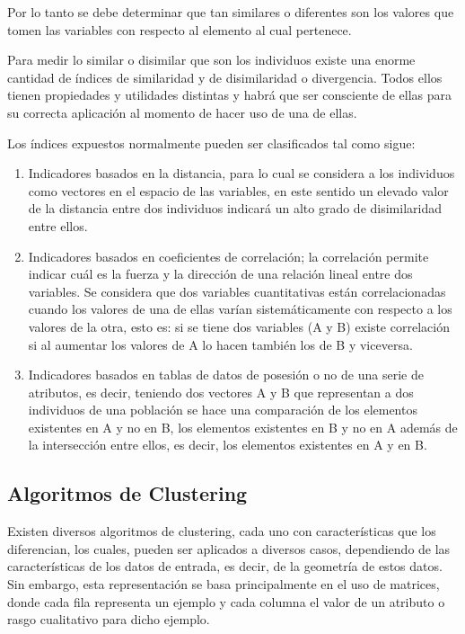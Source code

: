 Por lo tanto se debe determinar que tan similares o diferentes son los valores que tomen las variables con respecto al elemento al cual pertenece.

Para medir lo similar o disimilar que son los individuos existe una enorme cantidad de índices de similaridad y de disimilaridad o divergencia. Todos ellos tienen propiedades y utilidades distintas y habrá que ser consciente de ellas para su correcta aplicación al momento de hacer uso de una de ellas.

Los índices expuestos normalmente pueden ser clasificados tal como sigue:

\begin{enumerate}
	
	\item  Indicadores basados en la distancia, para lo cual se considera a los individuos como vectores en el espacio de las variables, en este sentido un elevado valor de la distancia entre dos individuos indicará un alto grado de disimilaridad entre ellos.
	
	\item Indicadores basados en coeficientes de correlación; la correlación permite indicar cuál es la fuerza y la dirección de una relación lineal entre dos variables. Se considera que dos variables cuantitativas están correlacionadas cuando los valores de una de ellas varían sistemáticamente con respecto a los valores de la otra, esto es: si se tiene dos variables (A y B) existe correlación si al aumentar los valores de A lo hacen también los de B y viceversa.
	
	\item Indicadores basados en tablas de datos de posesión o no de una serie de atributos, es decir, teniendo dos vectores A y B que representan a dos individuos de una población se hace una comparación de los elementos existentes en A y no en B, los elementos existentes en B y no en A además de la intersección entre ellos, es decir, los elementos existentes en A y en B. 
	
\end{enumerate}

\subsection{Algoritmos de Clustering}

Existen diversos algoritmos de clustering, cada uno con características que los diferencian, los cuales, pueden ser aplicados a diversos casos, dependiendo de las características de los datos de entrada, es decir, de la geometría de estos datos. Sin embargo, esta representación se basa principalmente en el uso de matrices, donde cada fila representa un ejemplo y cada columna el valor de un atributo o rasgo cualitativo para dicho ejemplo.

